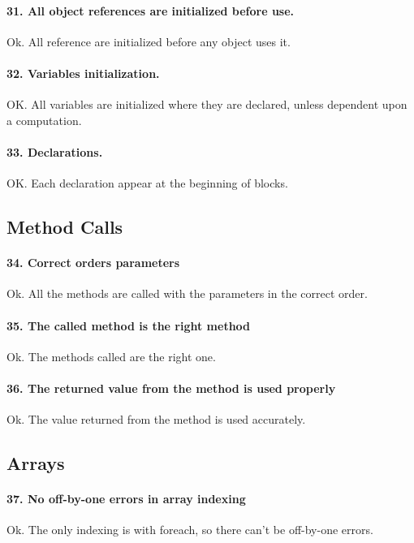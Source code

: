 \documentclass[english]{article}
\begin{document}
{{\paragraph{31. All object references are initialized before use.} 
Ok. All reference are initialized before any object uses it. 

\paragraph{32. Variables initialization.} 
OK. All variables are initialized where they are declared, unless dependent upon a computation.

\paragraph{33. Declarations.} OK. Each declaration appear at the beginning of blocks.

\subsection{Method Calls}

\paragraph{34. Correct orders parameters}

Ok. All the methods are called with the parameters in the correct order.

\paragraph{35. The called method is the right method}

Ok. The methods called are the right one.

\paragraph{36. The returned value from the method is used properly}

Ok. The value returned from the method is used accurately.


\subsection{Arrays}
\paragraph{37. No off-by-one errors in array indexing}
Ok.
The only indexing is with foreach, so there can't be off-by-one errors.

}}
\end{document}
